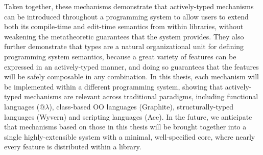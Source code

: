 Taken together, these mechanisms demonstrate that actively-typed mechanisms can be introduced throughout a programming system to allow users to extend both its compile-time and edit-time semantics from within libraries, without  weakening the metatheoretic guarantees that the system provides. They also further demonstrate that types are a natural organizational unit for defining programming system semantics, because a great variety of features can be expressed in an actively-typed manner, and doing so guarantees that the features will be safely composable in any combination. In this thesis, each mechanism will be implemented within a different programming system, showing that actively-typed mechanisms are relevant across traditional paradigms, including functional languages (@$\lambda$), class-based OO languages (Graphite), structurally-typed languages (Wyvern) and scripting languages (Ace). In the future, we anticipate that mechanisms based on those in this thesis will be brought together into a single highly-extensible system with a minimal, well-specified core, where nearly every feature is distributed within a library. 

